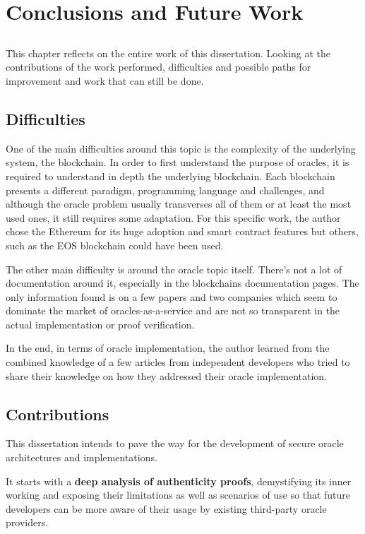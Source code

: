 \chapter{Conclusions and Future Work} \label{chap:concl}

\section*{}

This chapter reflects on the entire work of this dissertation. Looking at the contributions of the work performed, difficulties and possible paths for improvement and work that can still be done.

\section{Difficulties}
One of the main difficulties around this topic is the complexity of the underlying system, the blockchain. In order to first understand the purpose of oracles, it is required to understand in depth the underlying blockchain. Each blockchain presents a different paradigm, programming language and challenges, and although the oracle problem usually transverses all of them or at least the most used ones, it still requires some adaptation. For this specific work, the author chose the Ethereum for its huge adoption and smart contract features but others, such as the EOS blockchain could have been used.

The other main difficulty is around the oracle topic itself. There's not a lot of documentation around it, especially in the blockchains documentation pages. The only information found is on a few papers and two companies which seem to dominate the market of oracles-as-a-service and are not so transparent in the actual implementation or proof verification.

In the end, in terms of oracle implementation, the author learned from the combined knowledge of a few articles from independent developers who tried to share their knowledge on how they addressed their oracle implementation.


\section{Contributions}
This dissertation intends to pave the way for the development of secure oracle architectures and implementations.

It starts with a \textbf{deep analysis of authenticity proofs}, demystifying its inner working and exposing their limitations as well as scenarios of use so that future developers can be more aware of their usage by existing third-party oracle providers.

